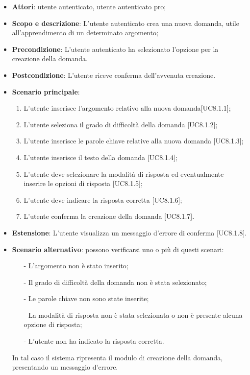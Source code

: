 	\begin{itemize}
		\item
			\textbf{Attori}: utente autenticato, utente autenticato pro;
		\item		
			\textbf{Scopo e descrizione}: L'utente autenticato crea una nuova domanda, utile all'apprendimento di un determinato argomento;
		\item
			\textbf{Precondizione}: L'utente autenticato ha selezionato l'opzione per la creazione della domanda. 
		\item
			\textbf{	Postcondizione}: L'utente riceve conferma dell'avvenuta creazione.		
		\item
			\textbf{Scenario principale}:
	       		\begin{enumerate}
					\item
					L'utente inserisce l'argomento relativo alla nuova domanda[UC8.1.1];
					\item
					L'utente seleziona il grado di difficoltà della domanda [UC8.1.2];
					\item
					L'utente inserisce le parole chiave relative alla nuova domanda [UC8.1.3];
					\item
					L'utente inserisce il testo della domanda [UC8.1.4];
					\item
					L'utente deve selezionare la modalità di risposta ed eventualmente inserire le opzioni di risposta [UC8.1.5];
					\item
					L'utente deve indicare la risposta corretta [UC8.1.6];
					\item
					L'utente conferma la creazione della domanda [UC8.1.7].
	 			\end{enumerate}
	 	\item
			\textbf{Estensione}: L'utente visualizza un messaggio d'errore di conferma [UC8.1.8].
	 	\item
	 		\textbf{Scenario alternativo}: possono verificarsi uno o più di questi scenari:
				\begin{itemize}
					\item[-] 	
						L'argomento non è stato inserito;
					\item[-] 
    						Il grado di difficoltà della domanda non è stata selezionato;
					\item[-] 
						Le parole chiave non sono state inserite;
					\item[-] 
						La modalità di risposta non è stata selezionata o non è presente alcuna opzione di risposta; 
					\item[-]
						L'utente non ha indicato la risposta corretta.	
				\end{itemize}
			In tal caso il sistema ripresenta il modulo di creazione della domanda, presentando un messaggio d'errore.
	\end{itemize}
